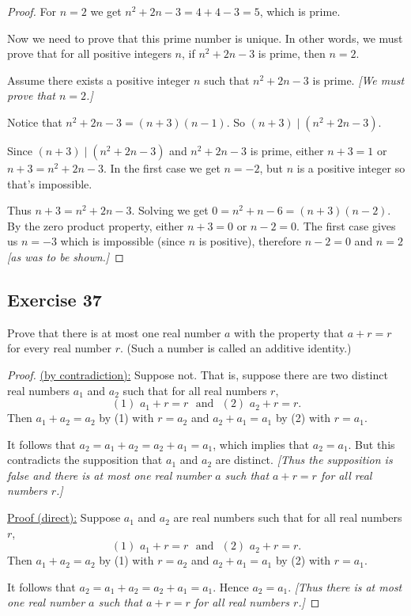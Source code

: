 \documentclass[14pt]{extarticle}
\begin{document}
\begin{proof}
For $n = 2$ we get $n^2 + 2n - 3 = 4 + 4 - 3 = 5$, which is prime. 

Now we need to prove that this prime number is unique. In other words, we must prove that for all positive integers $n$, if $n^2 + 2n - 3$ is prime, then $n=2$.

Assume there exists a positive integer $n$ such that $n^2 + 2n - 3$ is prime. {\it[We must prove that $n = 2$.]}

Notice that $n^2 + 2n - 3 = (n+3)(n-1)$. So $(n+3) \mid (n^2 + 2n - 3)$.

Since $(n+3) \mid (n^2 + 2n - 3)$ and $n^2 + 2n - 3$ is prime, either $n+3 = 1$ or $n+3 = n^2 + 2n - 3$. In the first case we get $n = -2$, but $n$ is a positive integer so that's impossible. 

Thus $n+3 = n^2 + 2n - 3$. Solving we get $0 = n^2 + n - 6 = (n+3)(n-2)$. By the zero product property, either $n+3 = 0$ or $n-2 = 0$. The first case gives us $n = -3$ which is impossible (since $n$ is positive), therefore $n-2 = 0$ and $n=2$ {\it [as was to be shown.]}
\end{proof}

\subsection{Exercise 37}
Prove that there is at most one real number $a$ with the property that $a + r = r$ for every real number $r$. (Such a number is called an additive identity.)

\begin{proof}
\underline{(by contradiction):} Suppose not. That is, suppose there are two distinct real numbers $a_1$ and $a_2$ such that for all real numbers $r$,
\[
(1) \,\, a_1 + r = r \,\,\text{ and }\,\, (2) \,\, a_2 + r = r.
\]
Then $a_1 + a_2 = a_2$ by (1) with $r = a_2$ and $a_2 + a_1 = a_1$ by (2) with $r = a_1$.

It follows that $a_2 = a_1 + a_2 = a_2 + a_1 = a_1$, which implies that $a_2 = a_1$. But this contradicts the supposition that $a_1$ and $a_2$ are distinct. {\it [Thus the supposition is false and there is at most one real number $a$ such that $a + r = r$ for all real numbers $r$.]}

\underline{Proof (direct):} Suppose $a_1$ and $a_2$ are real numbers such that for all real numbers $r$,
\[
(1) \,\, a_1 + r = r \,\,\text{ and }\,\, (2) \,\, a_2 + r = r.
\]
Then $a_1 + a_2 = a_2$ by (1) with $r = a_2$ and $a_2 + a_1 = a_1$ by (2) with $r = a_1$.

It follows that $a_2 = a_1 + a_2 = a_2 + a_1 = a_1$. Hence $a_2 = a_1$. {\it [Thus there is at most one real number $a$ such that $a + r = r$ for all real numbers $r$.]}
\end{proof}
\end{document}
